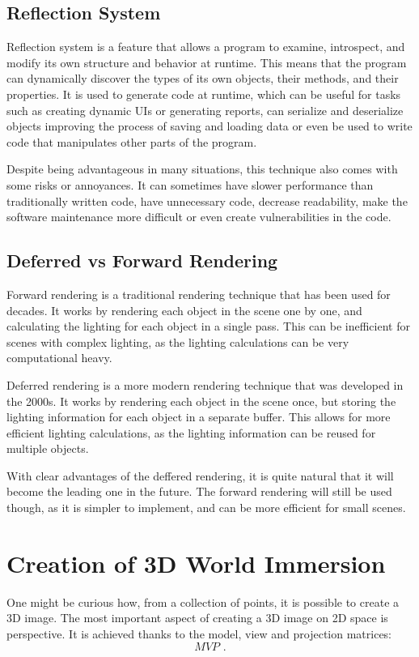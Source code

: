 \subsection{Reflection System}
\label{sec:refl}
\hspace{\parindent}
Reflection system is a feature that allows a program to examine, introspect, and modify its own structure and behavior at runtime. This means that the program can dynamically discover the types of its own objects, their methods, and their properties. It is used to generate code at runtime, which can be useful for tasks such as creating dynamic UIs or generating reports, can serialize and deserialize objects improving the process of saving and loading data or even be used to write code that manipulates other parts of the program.

Despite being advantageous in many situations, this technique also comes with some risks or annoyances. It can sometimes have slower performance than traditionally written code, have unnecessary code, decrease readability, make the software maintenance more difficult or even create vulnerabilities in the code.

\subsection{Deferred vs Forward Rendering}
\label{sec:defer_vs_forward}
\hspace{\parindent}
Forward rendering is a traditional rendering technique that has been used for decades. It works by rendering each object in the scene one by one, and calculating the lighting for each object in a single pass. This can be inefficient for scenes with complex lighting, as the lighting calculations can be very computational heavy.

Deferred rendering is a more modern rendering technique that was developed in the 2000s. It works by rendering each object in the scene once, but storing the lighting information for each object in a separate buffer. This allows for more efficient lighting calculations, as the lighting information can be reused for multiple objects.

With clear advantages of the deffered rendering, it is quite natural that it will become the leading one in the future. The forward rendering will still be used though, as it is simpler to implement, and can be more efficient for small scenes.

\newpage
\section{Creation of 3D World Immersion}
\hspace{\parindent}
One might be curious how, from a collection of points, it is possible to create a 3D image. The most important aspect of creating a 3D image on 2D space is perspective. It is achieved thanks to the model, view and projection matrices:
\begin{equation}
MVP
\text{ .}
\label{mvpequation}
\end{equation}

